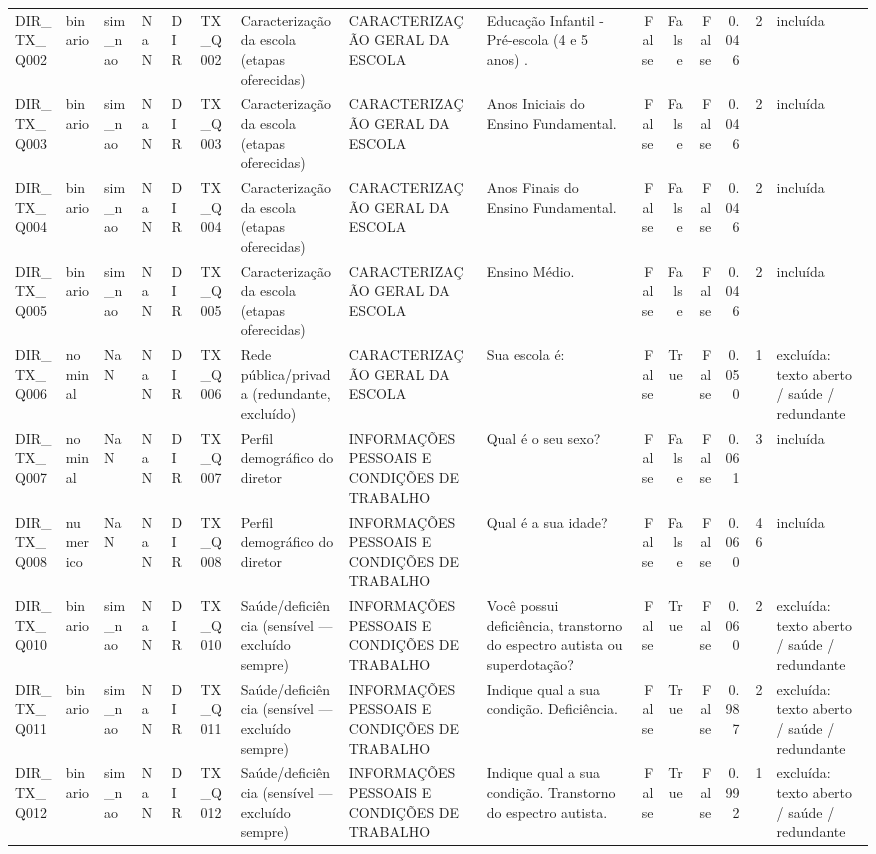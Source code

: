\begin{tabular}{lllllllllrrrrrl}
DIR\_TX\_Q002 & binario & sim\_nao & NaN & DIR & TX\_Q002 & Caracterização da escola (etapas oferecidas) & CARACTERIZAÇÃO GERAL DA ESCOLA & Educação Infantil  -  Pré-escola  (4 e 5 anos) . & False & False & False & 0.046 & 2 & incluída \\
DIR\_TX\_Q003 & binario & sim\_nao & NaN & DIR & TX\_Q003 & Caracterização da escola (etapas oferecidas) & CARACTERIZAÇÃO GERAL DA ESCOLA & Anos Iniciais do Ensino Fundamental. & False & False & False & 0.046 & 2 & incluída \\
DIR\_TX\_Q004 & binario & sim\_nao & NaN & DIR & TX\_Q004 & Caracterização da escola (etapas oferecidas) & CARACTERIZAÇÃO GERAL DA ESCOLA & Anos Finais do Ensino Fundamental. & False & False & False & 0.046 & 2 & incluída \\
DIR\_TX\_Q005 & binario & sim\_nao & NaN & DIR & TX\_Q005 & Caracterização da escola (etapas oferecidas) & CARACTERIZAÇÃO GERAL DA ESCOLA & Ensino Médio. & False & False & False & 0.046 & 2 & incluída \\
DIR\_TX\_Q006 & nominal & NaN & NaN & DIR & TX\_Q006 & Rede pública/privada (redundante, excluído) & CARACTERIZAÇÃO GERAL DA ESCOLA & Sua escola é: & False & True & False & 0.050 & 1 & excluída: texto aberto / saúde / redundante \\
DIR\_TX\_Q007 & nominal & NaN & NaN & DIR & TX\_Q007 & Perfil demográfico do diretor & INFORMAÇÕES PESSOAIS E CONDIÇÕES DE TRABALHO & Qual é o seu sexo? & False & False & False & 0.061 & 3 & incluída \\
DIR\_TX\_Q008 & numerico & NaN & NaN & DIR & TX\_Q008 & Perfil demográfico do diretor & INFORMAÇÕES PESSOAIS E CONDIÇÕES DE TRABALHO & Qual é a sua idade? & False & False & False & 0.060 & 46 & incluída \\
DIR\_TX\_Q010 & binario & sim\_nao & NaN & DIR & TX\_Q010 & Saúde/deficiência (sensível — excluído sempre) & INFORMAÇÕES PESSOAIS E CONDIÇÕES DE TRABALHO & Você possui deficiência, transtorno do espectro autista ou superdotação? & False & True & False & 0.060 & 2 & excluída: texto aberto / saúde / redundante \\
DIR\_TX\_Q011 & binario & sim\_nao & NaN & DIR & TX\_Q011 & Saúde/deficiência (sensível — excluído sempre) & INFORMAÇÕES PESSOAIS E CONDIÇÕES DE TRABALHO & Indique qual a sua condição. Deficiência. & False & True & False & 0.987 & 2 & excluída: texto aberto / saúde / redundante \\
DIR\_TX\_Q012 & binario & sim\_nao & NaN & DIR & TX\_Q012 & Saúde/deficiência (sensível — excluído sempre) & INFORMAÇÕES PESSOAIS E CONDIÇÕES DE TRABALHO & Indique qual a sua condição. Transtorno do espectro autista. & False & True & False & 0.992 & 1 & excluída: texto aberto / saúde / redundante \\

\end{tabular}
